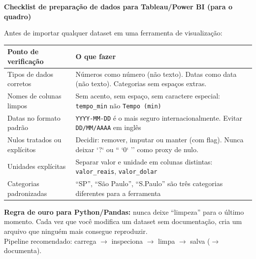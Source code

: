 \begin{BoardBox}
\textbf{Checklist de preparação de dados para Tableau/Power BI (para o quadro)}

Antes de importar qualquer dataset em uma ferramenta de visualização:

\begin{tabular}{|p{4cm}|p{9cm}|}
\hline
\textbf{Ponto de verificação} & \textbf{O que fazer} \\
\hline
Tipos de dados corretos & Números como número (não texto). Datas como data (não texto). Categorias sem espaços extras.\\
Nomes de colunas limpos & Sem acento, sem espaço, sem caractere especial: \texttt{tempo\_min} não \texttt{Tempo (min)} \\
Datas no formato padrão & \texttt{YYYY-MM-DD} é o mais seguro internacionalmente. Evitar \texttt{DD/MM/AAAA} em inglês \\
Nulos tratados ou explícitos & Decidir: remover, imputar ou manter (com flag). Nunca deixar `?` ou `` `0` '' como proxy de nulo. \\
Unidades explícitas & Separar valor e unidade em colunas distintas: \texttt{valor\_reais}, \texttt{valor\_dolar} \\
Categorias padronizadas & ``SP'', ``São Paulo'', ``S.Paulo'' são três categorias diferentes para a ferramenta \\
\hline
\end{tabular}
\end{BoardBox}

\begin{NoteBox}
\textbf{Regra de ouro para Python/Pandas:} nunca deixe ``limpeza'' para o
último momento. Cada vez que você modifica um dataset sem documentação,
cria um arquivo que ninguém mais consegue reproduzir.\\
Pipeline recomendado: carrega $\to$ inspeciona $\to$ limpa $\to$ salva ($\to$ documenta).
\end{NoteBox}

